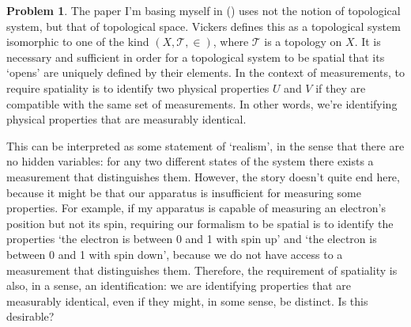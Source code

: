 \documentclass{article}
\theoremstyle{definition}
\newtheorem{problem}{Problem}
\begin{document}
\begin{problem}
The paper I'm basing myself in (\cite{measurement}) uses not the notion of topological system, but that of topological space. Vickers defines this as a topological system isomorphic to one of the kind $(X, \mathcal{T}, \in)$, where $\mathcal{T}$ is a topology on $X$. It is necessary and sufficient in order for a topological system to be spatial that its `opens' are uniquely defined by their elements. In the context of measurements, to require spatiality is to identify two physical properties $U$ and $V$ if they are compatible with the same set of measurements. In other words, we're identifying physical properties that are measurably identical.

This can be interpreted as some statement of `realism', in the sense that there are no hidden variables: for any two different states of the system there exists a measurement that distinguishes them. However, the story doesn't quite end here, because it might be that our apparatus is insufficient for measuring some properties. For example, if my apparatus is capable of measuring an electron's position but not its spin, requiring our formalism to be spatial is to identify the properties `the electron is between 0 and 1 with spin up' and `the electron is between 0 and 1 with spin down', because we do not have access to a measurement that distinguishes them. Therefore, the requirement of spatiality is also, in a sense, an identification: we are identifying properties that are measurably identical, even if they might, in some sense, be distinct. Is this desirable?
\end{problem}
\end{document}

